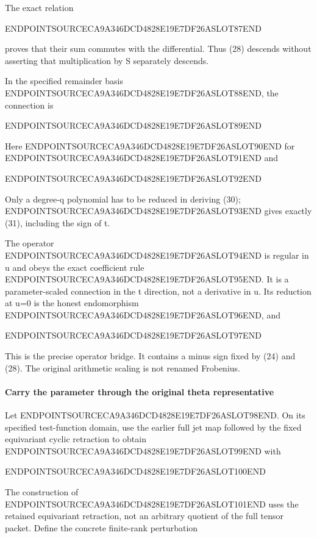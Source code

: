 The exact relation

ENDPOINTSOURCECA9A346DCD4828E19E7DF26ASLOT87END

proves that their sum commutes with the differential. Thus (28) descends without asserting that multiplication by S separately descends.

In the specified remainder basis ENDPOINTSOURCECA9A346DCD4828E19E7DF26ASLOT88END, the connection is

ENDPOINTSOURCECA9A346DCD4828E19E7DF26ASLOT89END

Here ENDPOINTSOURCECA9A346DCD4828E19E7DF26ASLOT90END for ENDPOINTSOURCECA9A346DCD4828E19E7DF26ASLOT91END and

ENDPOINTSOURCECA9A346DCD4828E19E7DF26ASLOT92END

Only a degree-q polynomial has to be reduced in deriving (30); ENDPOINTSOURCECA9A346DCD4828E19E7DF26ASLOT93END gives exactly (31), including the sign of t.

The operator ENDPOINTSOURCECA9A346DCD4828E19E7DF26ASLOT94END is regular in u and obeys the exact coefficient rule ENDPOINTSOURCECA9A346DCD4828E19E7DF26ASLOT95END. It is a parameter-scaled connection in the t direction, not a derivative in u. Its reduction at u=0 is the honest endomorphism ENDPOINTSOURCECA9A346DCD4828E19E7DF26ASLOT96END, and

ENDPOINTSOURCECA9A346DCD4828E19E7DF26ASLOT97END

This is the precise operator bridge. It contains a minus sign fixed by (24) and (28). The original arithmetic scaling is not renamed Frobenius.

\paragraph{Carry the parameter through the original theta representative}\label{endpoint-exponential_original--carry-the-parameter-through-the-original-theta-representative}

Let ENDPOINTSOURCECA9A346DCD4828E19E7DF26ASLOT98END. On its specified test-function domain, use the earlier full jet map followed by the fixed equivariant cyclic retraction to obtain ENDPOINTSOURCECA9A346DCD4828E19E7DF26ASLOT99END with

ENDPOINTSOURCECA9A346DCD4828E19E7DF26ASLOT100END

The construction of ENDPOINTSOURCECA9A346DCD4828E19E7DF26ASLOT101END uses the retained equivariant retraction, not an arbitrary quotient of the full tensor packet. Define the concrete finite-rank perturbation

